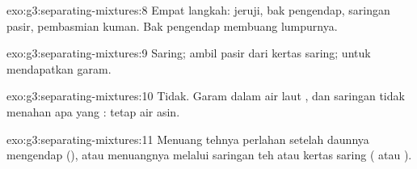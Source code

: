 \begin{solution}{exo:g3:separating-mixtures:8}
Empat langkah: jeruji, bak pengendap, saringan pasir, pembasmian kuman.
Bak pengendap membuang lumpurnya.
\end{solution}

\begin{solution}{exo:g3:separating-mixtures:9}
Saring; ambil pasir dari kertas saring;   untuk
mendapatkan garam.
\end{solution}

\begin{solution}{exo:g3:separating-mixtures:10}
Tidak. Garam dalam air laut , dan saringan tidak menahan apa yang
:  tetap air asin.
\end{solution}

\begin{solution}{exo:g3:separating-mixtures:11}
Menuang tehnya perlahan setelah daunnya mengendap (), atau
menuangnya melalui saringan teh atau kertas saring ( atau
).
\end{solution}
